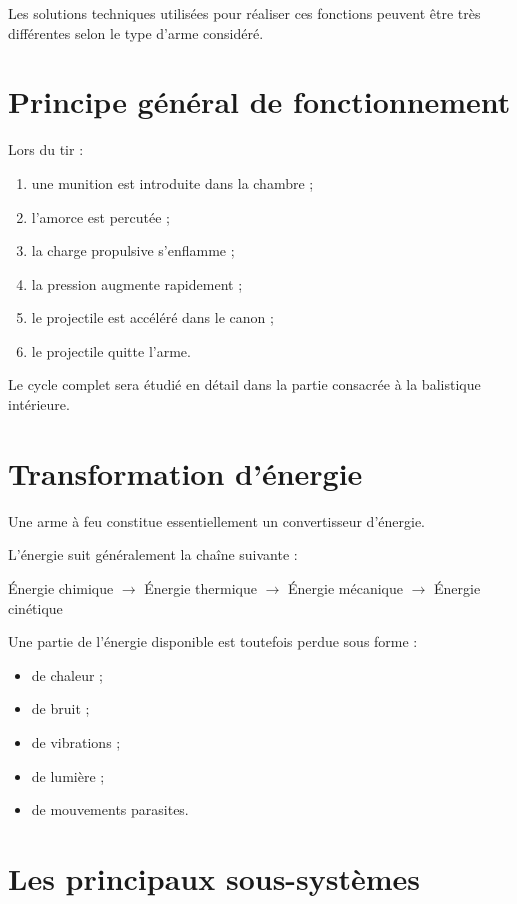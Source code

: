 Les solutions techniques utilisées pour réaliser ces fonctions peuvent être
très différentes selon le type d'arme considéré.

\section{Principe général de fonctionnement}

Lors du tir :

\begin{enumerate}
    \item une munition est introduite dans la chambre ;
    \item l'amorce est percutée ;
    \item la charge propulsive s'enflamme ;
    \item la pression augmente rapidement ;
    \item le projectile est accéléré dans le canon ;
    \item le projectile quitte l'arme.
\end{enumerate}

Le cycle complet sera étudié en détail dans la partie consacrée à la
balistique intérieure.

\section{Transformation d'énergie}

Une arme à feu constitue essentiellement un convertisseur d'énergie.

L'énergie suit généralement la chaîne suivante :

\begin{center}
Énergie chimique
$\rightarrow$
Énergie thermique
$\rightarrow$
Énergie mécanique
$\rightarrow$
Énergie cinétique
\end{center}

Une partie de l'énergie disponible est toutefois perdue sous forme :

\begin{itemize}
    \item de chaleur ;
    \item de bruit ;
    \item de vibrations ;
    \item de lumière ;
    \item de mouvements parasites.
\end{itemize}

\section{Les principaux sous-systèmes}

